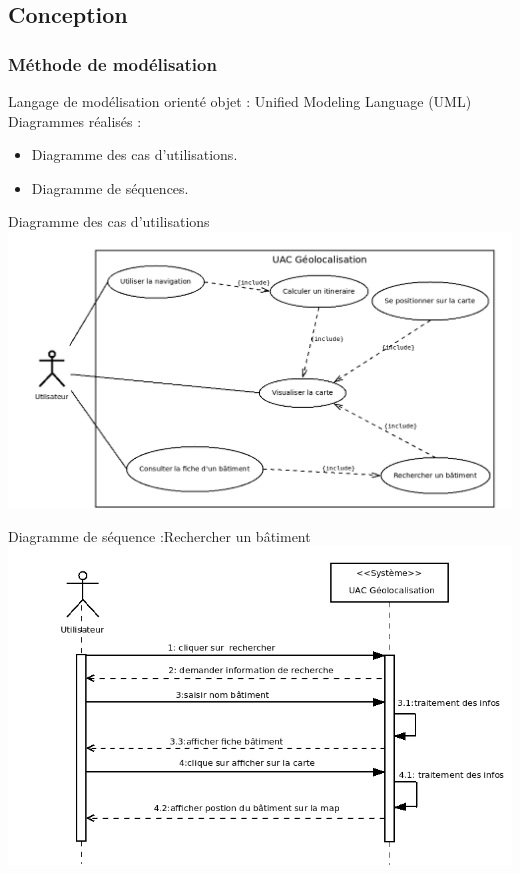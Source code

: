 \documentclass[11pt,handout]{beamer}
\begin{document}
		\subsection{Conception}
			\begin{frame}
			  \frametitle{Méthode de modélisation}
				Langage de modélisation orienté objet : Unified Modeling Language (UML)\\
				Diagrammes réalisés :
				\begin{itemize}
				 [square]
				 \item Diagramme des cas d'utilisations.
				 \item Diagramme de séquences.
				\end{itemize}
			\end{frame}
			\begin{frame}
			    \begin{block}{Diagramme des cas d'utilisations}
			      \includegraphics[scale=0.3]{images/cas_utilisation.png}
			    \end{block}
			\end{frame}
			\begin{frame}
			    \begin{block}{Diagramme de séquence :Rechercher un bâtiment}
			      \includegraphics[scale=0.4]{images/sequence_batiment.png}
			    \end{block}
			\end{frame}
\end{document}
